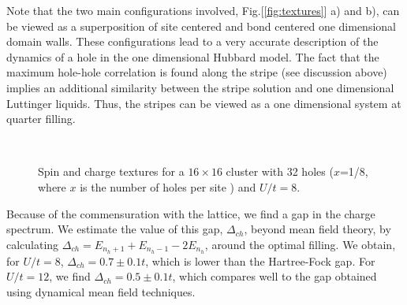 Note that the two main configurations involved,
Fig.[\ref{fig:textures}] a) and b), can be viewed as a superposition of 
site centered and bond centered one dimensional domain walls\cite{BJ00}.
These configurations lead to a very accurate description of the
dynamics of a hole in the one dimensional Hubbard model\cite{BJ00}.
The fact that the 
maximum hole-hole correlation
is found along the stripe (see discussion above)
implies an additional similarity
between the stripe solution and one dimensional Luttinger liquids.
Thus, the stripes can be viewed as a one dimensional system 
at quarter filling. 
\begin{figure}
\begin{center}
\mbox{\epsfxsize 8cm }
\end{center}
\caption{Spin and charge textures for a $16 \times 16$ cluster with 32
holes ($x$=1/8, where $x$ is the number of
holes per site ) and $U/t = 8$.}
\label{fig:cluster16}
\end{figure}
Because of the commensuration with the lattice,
we find a gap in the charge spectrum. We estimate the value of this
gap, $\Delta_{ch}$, beyond mean field theory,
by calculating $\Delta_{ch} = E_{n_h + 1}
+ E_{n_h - 1} - 2 E_{n_h}$, around the optimal filling.
We obtain, for $U/t = 8$, $\Delta_{ch} = 0.7 \pm 0.1 t$, which is lower
than the Hartree-Fock gap. For $U/t = 12$,
we find $\Delta_{ch} = 0.5 \pm 0.1 t$,
which compares well to the gap obtained using dynamical mean field
techniques\cite{Fetal99}. 

